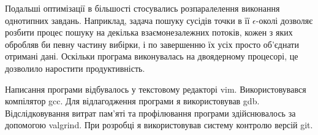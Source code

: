         Подальші оптимізації в більшості стосувались розпаралелення виконання однотипних завдань. Наприклад, задача пошуку сусідів точки в її $\epsilon$-околі дозволяє розбити процес пошуку на декілька взаємонезалежних потоків, кожен з яких обробляв би певну частину вибірки, і по завершенню їх усіх просто об'єднати отримані дані. Оскільки програма виконувалась на двоядерному процесорі, це дозволило наростити продуктивність.
        
        Написання програми відбувалось у текстовому редакторі vim. Використовувався компілятор gcc. Для відлагодження програми я використовував gdb. Відслідковування витрат пам'яті та профілювання програми здійснювалось за допомогою valgrind. При розробці я використовував систему контролю версій git.
